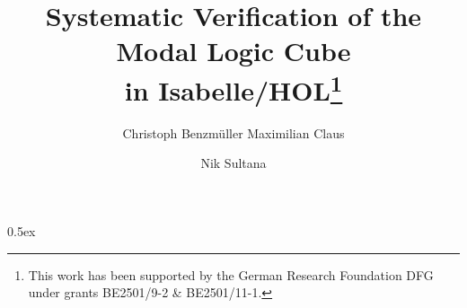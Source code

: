 \documentclass{eptcs}
\begin{document}
\title{Systematic Verification of the Modal Logic Cube \\ in Isabelle/HOL\thanks{This work has been supported by the German Research Foundation DFG under grants BE2501/9-2 \&
    BE2501/11-1.}}
\author{Christoph Benzm\"uller \qquad \qquad Maximilian Claus 
\and
Nik Sultana
}
\def\titlerunning{Systematic Verification of the Modal Logic Cube in Isabelle/HOL}
\def\authorrunning{Christoph Benzm\"uller, Maximilian Claus and Nik Sultana}

\maketitle




\parindent 0pt\parskip 0.5ex



%


\end{document}
